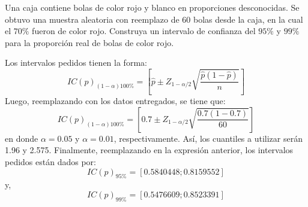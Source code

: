 
\question[10] Una caja contiene bolas de color rojo y blanco en proporciones desconocidas. Se obtuvo una muestra aleatoria con reemplazo de 60 bolas desde la caja, en la cual el $70\%$ fueron de color rojo. Construya un intervalo de confianza del $95\%$ y $99\%$ para la proporci\'on real de bolas de color rojo.

\begin{solution}
Los intervalos pedidos tienen la forma:$$IC(p)_{(1-\alpha)100\%}=\left[ \hat{p}\pm Z_{1-\alpha/2}\sqrt{\dfrac{\hat{p}(1-\hat{p})}{n}}\right]$$Luego, reemplazando con los datos entregados, se tiene que:$$IC(p)_{(1-\alpha)100\%}=\left[0.7\pm Z_{1-\alpha/2}\sqrt{\dfrac{0.7(1-0.7)}{60}}\right]$$en donde $\alpha=0.05$ y $\alpha=0.01$, respectivamente. As\'i, los cuantiles a utilizar ser\'an 1.96 y 2.575. Finalmente, reemplazando en la expresi\'on anterior, los intervalos pedidos est\'an dados por:$$IC(p)_{95\%}=\left[0.5840448;0.8159552\right]$$y,$$IC(p)_{99\%}=\left[0.5476609;0.8523391\right]$$
\end{solution}